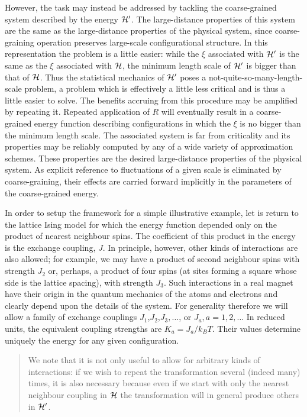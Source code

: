 \documentclass[
  letterpaper,
  enabledeprecatedfontcommands]{report}
\begin{document}
\begin{tcolorbox}
However, the task may instead be addressed by tackling the
coarse-grained system described by the energy \({\cal H}^\prime\). The
large-distance properties of this system are the same as the
large-distance properties of the physical system, since coarse-graining
operation preserves large-scale configurational structure. In this
representation the problem is a little easier: while the \(\xi\)
associated with \({\cal H}^\prime\) is the same as the \(\xi\)
associated with \({\cal H}\), the minimum length scale of
\({\cal H}^\prime\) is bigger than that of \({\cal H}\). Thus the
statistical mechanics of \({\cal H}^\prime\) poses a
not-quite-so-many-length-scale problem, a problem which is effectively a
little less critical and is thus a little easier to solve. The benefits
accruing from this procedure may be amplified by repeating it. Repeated
application of \(R\) will eventually result in a coarse- grained energy
function describing configurations in which the \(\xi\) is no bigger
than the minimum length scale. The associated system is far from
criticality and its properties may be reliably computed by any of a wide
variety of approximation schemes. These properties are the desired
large-distance properties of the physical system. As explicit reference
to fluctuations of a given scale is eliminated by coarse-graining, their
effects are carried forward implicitly in the parameters of the
coarse-grained energy.

In order to setup the framework for a simple illustrative example, let
is return to the lattice Ising model for which the energy function
depended only on the product of nearest neighbour spins. The coefficient
of this product in the energy is the exchange coupling, \(J\). In
principle, however, other kinds of interactions are also allowed; for
example, we may have a product of second neighbour spins with strength
\(J_2\) or, perhaps, a product of four spins (at sites forming a square
whose side is the lattice spacing), with strength \(J_3\). Such
interactions in a real magnet have their origin in the quantum mechanics
of the atoms and electrons and clearly depend upon the details of the
system. For generality therefore we will allow a family of exchange
couplings \(J_1\),\(J_2\),\(J_3,\dots\), or \(J_a, a =
1,2,\dots\) In reduced units, the equivalent coupling strengths are
\(K_a =J_a/k_BT\). Their values determine uniquely the energy for any
given configuration.

\begin{quote}
We note that it is not only useful to allow for arbitrary kinds of
interactions: if we wish to repeat the transformation several (indeed
many) times, it is also necessary because even if we start with only the
nearest neighbour coupling in \({\cal H}\) the transformation will in
general produce others in \({\cal H}^\prime\).
\end{quote}


\end{tcolorbox}
\end{document}
